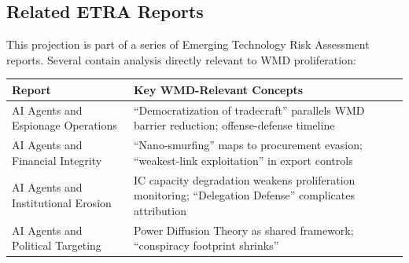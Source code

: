 \documentclass[11pt,letterpaper]{article}
\begin{document}
\subsection*{Related ETRA Reports}

This projection is part of a series of Emerging Technology Risk Assessment reports. Several contain analysis directly relevant to WMD proliferation:

\begin{center}
\small
\begin{tabular}{L{5cm}L{7cm}}
\toprule
\textbf{Report} & \textbf{Key WMD-Relevant Concepts} \\
\midrule
AI Agents and Espionage Operations & ``Democratization of tradecraft'' parallels WMD barrier reduction; offense-defense timeline \\
AI Agents and Financial Integrity & ``Nano-smurfing'' maps to procurement evasion; ``weakest-link exploitation'' in export controls \\
AI Agents and Institutional Erosion & IC capacity degradation weakens proliferation monitoring; ``Delegation Defense'' complicates attribution \\
AI Agents and Political Targeting & Power Diffusion Theory as shared framework; ``conspiracy footprint shrinks'' \\
\bottomrule
\end{tabular}
\end{center}

\newpage
\end{document}

